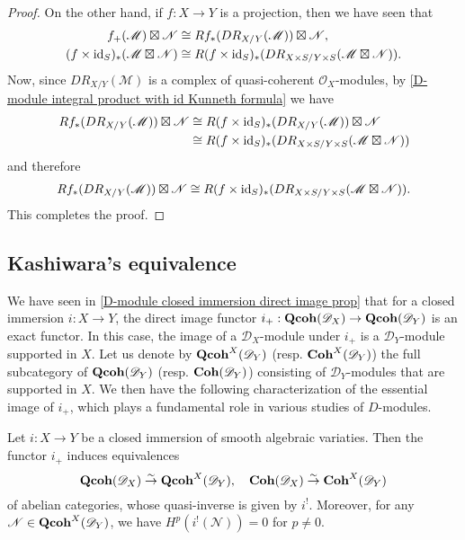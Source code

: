 \begin{proof}
On the other hand, if $f:X\to Y$ is a projection, then we have seen that
\begin{align*}
f_+(\mathscr{M})\boxtimes\mathscr{N}&\cong Rf_*(DR_{X/Y}(\mathscr{M}))\boxtimes\mathscr{N},\\
(f\times\operatorname{id}_S)_*(\mathscr{M}\boxtimes\mathscr{N})&\cong R(f\times\operatorname{id}_S)_*(DR_{X\times S/Y\times S}(\mathscr{M}\boxtimes\mathscr{N})).
\end{align*}
Now, since $DR_{X/Y}(\mathscr{M})$ is a complex of quasi-coherent $\mathscr{O}_X$-modules, by \cref{D-module integral product with id Kunneth formula} we have
\begin{align*}
Rf_*(DR_{X/Y}(\mathscr{M}))\boxtimes\mathscr{N}&\cong R(f\times\operatorname{id}_S)_*(DR_{X/Y}(\mathscr{M}))\boxtimes\mathscr{N}\\
&\cong R(f\times\operatorname{id}_S)_*(DR_{X\times S/Y\times S}(\mathscr{M}\boxtimes\mathscr{N}))
\end{align*}
and therefore
\begin{align*}
Rf_*(DR_{X/Y}(\mathscr{M}))\boxtimes\mathscr{N}\cong R(f\times\operatorname{id}_S)_*(DR_{X\times S/Y\times S}(\mathscr{M}\boxtimes\mathscr{N})).
\end{align*}
This completes the proof.
\end{proof}

\subsection{Kashiwara's equivalence}
We have seen in \cref{D-module closed immersion direct image prop} that for a closed immersion $i:X\to Y$, the direct image functor $i_+:\mathbf{Qcoh}(\mathscr{D}_X)\to \mathbf{Qcoh}(\mathscr{D}_Y)$ is an exact functor. In this case, the image of a $\mathscr{D}_X$-module under $i_+$ is a $\mathscr{D}_Y$-module supported in $X$. Let us denote by $\mathbf{Qcoh}^X(\mathscr{D}_Y)$ (resp. $\mathbf{Coh}^X(\mathscr{D}_Y)$) the full subcategory of $\mathbf{Qcoh}(\mathscr{D}_Y)$ (resp. $\mathbf{Coh}(\mathscr{D}_Y)$) consisting of $\mathscr{D}_Y$-modules that are supported in $X$. We then have the following characterization of the essential image of $i_+$, which plays a fundamental role in various studies of $D$-modules.

\begin{theorem}\label{D-module closed immersion Kashiwara equivalence on ab cat}
Let $i:X\to Y$ be a closed immersion of smooth algebraic variaties. Then the functor $i_+$ induces equivalences
\[\mathbf{Qcoh}(\mathscr{D}_X)\stackrel{\sim}{\to} \mathbf{Qcoh}^X(\mathscr{D}_Y),\quad \mathbf{Coh}(\mathscr{D}_X)\stackrel{\sim}{\to} \mathbf{Coh}^X(\mathscr{D}_Y)\]
of abelian categories, whose quasi-inverse is given by $i^!$. Moreover, for any $\mathscr{N}\in\mathbf{Qcoh}^X(\mathscr{D}_Y)$, we have $H^p(i^!(\mathscr{N}))=0$ for $p\neq 0$.
\end{theorem}

